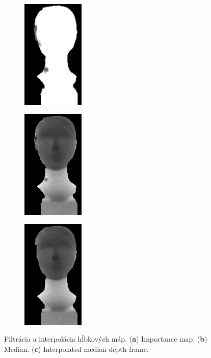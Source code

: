 \begin{figure}[h]
	\centering
	\begin{subfigure}[b]{0.32\textwidth}
		\centering
		\includegraphics[height=5.2cm]{figures/importance_map-a.png}
		\caption{}
		\label{fig:imap:a}
	\end{subfigure}
	\hfill
	\begin{subfigure}[b]{0.32\textwidth}
		\centering
		\includegraphics[height=5.2cm]{figures/importance_map-b.png}
		\caption{}
		\label{fig:imap:b}
	\end{subfigure}
	\hfill
	\begin{subfigure}[b]{0.32\textwidth}
		\centering
		\includegraphics[height=5.2cm]{figures/importance_map-c.png}
		\caption{}
		\label{fig:imap:c}
	\end{subfigure}
	\caption{Filtrácia a interpolácia hĺbkových máp. (\textbf{a}) Importance map. (\textbf{b}) Median. (\textbf{c}) Interpolated median depth frame.}
	\label{fig:imap}
\end{figure}

